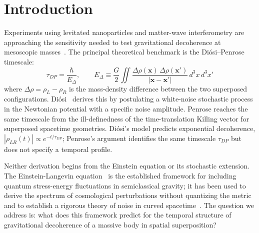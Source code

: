 \documentclass[12pt,a4paper]{article}
\theoremstyle{remark}
\begin{document}
\section{Introduction}

Experiments using levitated nanoparticles and matter-wave interferometry are approaching
the sensitivity needed to test gravitational decoherence at mesoscopic
masses~\cite{bose,maqro}. The principal theoretical benchmark is the Di\'osi--Penrose
timescale:
\begin{equation}
\tau_{DP} = \frac{\hbar}{E_\Delta}, \qquad
E_\Delta \equiv \frac{G}{2}\iint \frac{\Delta\rho(\mathbf{x})\,\Delta\rho(\mathbf{x}')}{|\mathbf{x}-\mathbf{x}'|}\,d^3x\,d^3x'
\label{eq:tau_dp}
\end{equation}
where $\Delta\rho = \rho_L - \rho_R$ is the mass-density difference between the two
superposed configurations. Di\'osi~\cite{diosi} derives this by postulating a white-noise
stochastic process in the Newtonian potential with a specific noise amplitude. Penrose
\cite{penrose} reaches the same timescale from the ill-definedness of the time-translation
Killing vector for superposed spacetime geometries. Di\'osi's model predicts exponential decoherence,
$|\rho_{LR}(t)| \propto e^{-t/\tau_{DP}}$; Penrose's argument identifies the same
timescale $\tau_{DP}$ but does not specify a temporal profile.

Neither derivation begins from the Einstein equation or its stochastic extension. The
Einstein-Langevin equation~\cite{hu_verdaguer} is the established framework for including
quantum stress-energy fluctuations in semiclassical gravity; it has been used to derive the
spectrum of cosmological perturbations without quantizing the metric~\cite{roura_verdaguer}
and to establish a rigorous theory of noise in curved spacetime~\cite{phillips_hu}. The
question we address is: what does this framework predict for the temporal structure of
gravitational decoherence of a massive body in spatial superposition?
\end{document}

